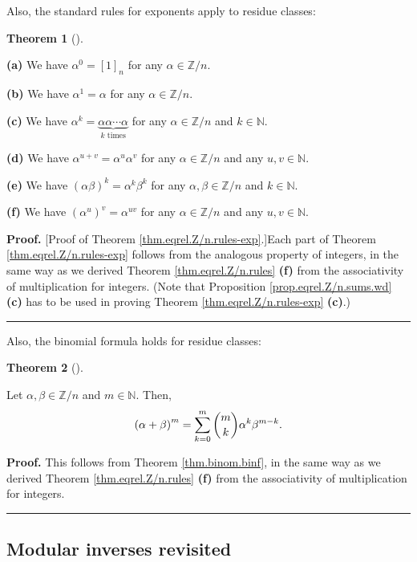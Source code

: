 \documentclass[numbers=enddot,12pt,final,onecolumn,notitlepage]{scrartcl}%
\numberwithin{exer}{subsection}
\theoremstyle{definition}
\newtheorem{theo}{Theorem}[subsection]
\newenvironment{theorem}[1][]
{\begin{theo}[#1]\begin{leftbar}}
{\end{leftbar}\end{theo}}
\newenvironment{proof}[1][Proof]{\noindent\textbf{#1.} }{\ \rule{0.5em}{0.5em}}
\let\sumnonlimits\sum
\renewcommand{\sum}{\sumnonlimits\limits}
\begin{document}
Also, the standard rules for exponents apply to residue classes:

\begin{theorem}
\label{thm.eqrel.Z/n.rules-exp}\textbf{(a)} We have $\alpha^{0}=\left[
1\right]  _{n}$ for any $\alpha\in\mathbb{Z}/n$.

\textbf{(b)} We have $\alpha^{1}=\alpha$ for any $\alpha\in\mathbb{Z}/n$.

\textbf{(c)} We have $\alpha^{k}=\underbrace{\alpha\alpha\cdots\alpha
}_{k\text{ times}}$ for any $\alpha\in\mathbb{Z}/n$ and $k\in\mathbb{N}$.

\textbf{(d)} We have $\alpha^{u+v}=\alpha^{u}\alpha^{v}$ for any $\alpha
\in\mathbb{Z}/n$ and any $u,v\in\mathbb{N}$.

\textbf{(e)} We have $\left(  \alpha\beta\right)  ^{k}=\alpha^{k}\beta^{k}$
for any $\alpha,\beta\in\mathbb{Z}/n$ and $k\in\mathbb{N}$.

\textbf{(f)} We have $\left(  \alpha^{u}\right)  ^{v}=\alpha^{uv}$ for any
$\alpha\in\mathbb{Z}/n$ and any $u,v\in\mathbb{N}$.
\end{theorem}

\begin{proof}
[Proof of Theorem \ref{thm.eqrel.Z/n.rules-exp}.]Each part of Theorem
\ref{thm.eqrel.Z/n.rules-exp} follows from the analogous property of integers,
in the same way as we derived Theorem \ref{thm.eqrel.Z/n.rules} \textbf{(f)}
from the associativity of multiplication for integers. (Note that Proposition
\ref{prop.eqrel.Z/n.sums.wd} \textbf{(c)} has to be used in proving Theorem
\ref{thm.eqrel.Z/n.rules-exp} \textbf{(c)}.)
\end{proof}

Also, the binomial formula holds for residue classes:

\begin{theorem}
\label{thm.eqrel.Z/n.binf}Let $\alpha,\beta\in\mathbb{Z}/n$ and $m\in
\mathbb{N}$. Then,%
\[
\left(  \alpha+\beta\right)  ^{m}=\sum_{k=0}^{m}\dbinom{m}{k}\alpha^{k}%
\beta^{m-k}.
\]

\end{theorem}

\begin{proof}
This follows from Theorem \ref{thm.binom.binf}, in the same way as we derived
Theorem \ref{thm.eqrel.Z/n.rules} \textbf{(f)} from the associativity of
multiplication for integers.
\end{proof}

\subsection{\label{sect.equiv.modinv}Modular inverses revisited}
\end{document}
